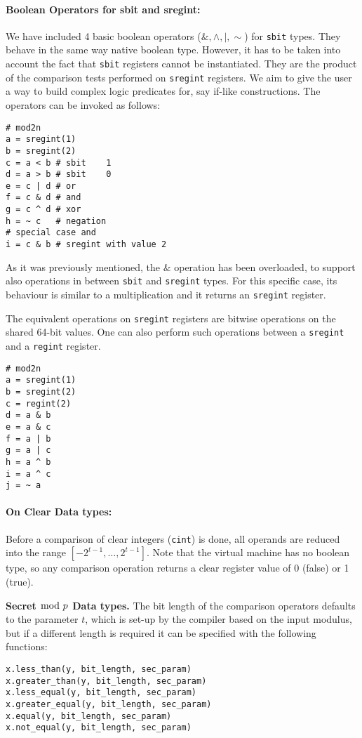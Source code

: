 \paragraph{Boolean Operators for sbit and sregint:}
We have included 4 basic boolean operators ($\&, \wedge, |, \sim$) for \verb|sbit| types. 
They behave in the same way native boolean type. However, it has to be taken into account 
the fact that \verb|sbit| registers cannot be instantiated. They are the product of the 
comparison tests performed on \verb|sregint| registers. 
We aim to give the user a way to build complex logic predicates for, say if-like constructions. The operators can be invoked as follows: 
\begin{lstlisting}
# mod2n
a = sregint(1)
b = sregint(2)
c = a < b # sbit    1
d = a > b # sbit    0
e = c | d # or
f = c & d # and     
g = c ^ d # xor
h = ~ c   # negation
# special case and
i = c & b # sregint with value 2
\end{lstlisting}
As it was previously mentioned, the $\&$ operation has been overloaded, 
to support also operations in between \verb|sbit| and \verb|sregint| types. 
For this specific case, its behaviour is similar to a multiplication and it returns 
an \verb|sregint| register.

The equivalent operations on \verb|sregint| registers are bitwise operations on the 
shared 64-bit values. One can also perform such operations between a
\verb|sregint| and a \verb|regint| register.
\begin{lstlisting}
# mod2n
a = sregint(1)
b = sregint(2)
c = regint(2)
d = a & b
e = a & c
f = a | b
g = a | c
h = a ^ b
i = a ^ c
j = ~ a 
\end{lstlisting}

\paragraph{On Clear Data types:} Before a comparison of clear integers (\verb|cint|) is done,
all operands are reduced into the range $[-2^{t-1}, \dots, 2^{t-1}]$.
Note that the virtual machine has no boolean type,
so any comparison operation returns a clear register value of 0
(false) or 1 (true).

\noindent
\textbf{Secret $\bmod \; p$ Data types.}  
The bit length of the comparison operators defaults to the parameter $t$, 
which is set-up by the compiler based on the input modulus, 
but if a different length is required it can be specified with the following functions:

\begin{lstlisting}
x.less_than(y, bit_length, sec_param)
x.greater_than(y, bit_length, sec_param)
x.less_equal(y, bit_length, sec_param)
x.greater_equal(y, bit_length, sec_param)
x.equal(y, bit_length, sec_param)
x.not_equal(y, bit_length, sec_param)
\end{lstlisting}

